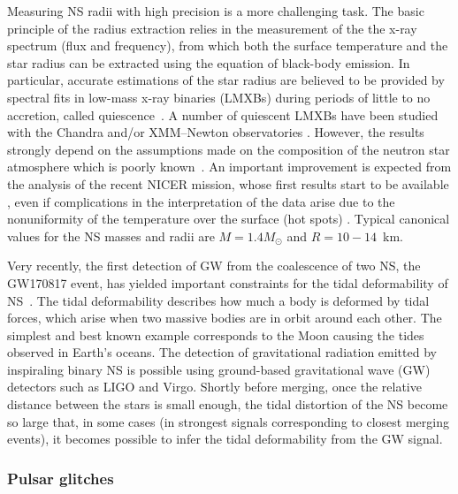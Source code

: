 Measuring NS radii with high precision is a more challenging task.
The basic principle of the radius extraction relies in the measurement of the 
the x-ray spectrum (flux and frequency), from which both the surface 
temperature and the star radius can be extracted using the equation of 
black-body emission.
In particular, accurate estimations of the star radius are believed to be 
provided by spectral fits in low-mass x-ray binaries (LMXBs) during periods of 
little to no accretion, called quiescence~\cite{Brown1998}.
%
A number of quiescent LMXBs have been studied with the Chandra and/or 
XMM–Newton 
observatories \cite{Heinke2014,Servillat2012,Guillot2014,Guillot2013}.
%
However, the results strongly depend on the assumptions made on the composition
of the neutron star atmosphere which is poorly known~\cite{Steiner2018}. 
An important improvement is expected from the analysis of the recent NICER 
mission, whose first results start to be available 
\cite{Bogdanov2019a,Bogdanov2019b,Miller2019,Raaijmakers2019,Riley2019}, 
even if complications in the interpretation of the 
data arise due to the nonuniformity of the temperature over the surface (hot
spots) \cite{Bogdanov2019a,Bogdanov2019b,Miller2019,Raaijmakers2019,Riley2019}. 
Typical canonical values for the NS masses and radii are $M = 1.4M_\odot$ and
$R=10-14$~km.
 
Very recently, the first detection of GW from the coalescence of two NS, 
the GW170817 event, has yielded important constraints for the tidal 
deformability of NS~\cite{GW1}.
The tidal deformability describes how much a body is deformed by tidal forces,
which arise when two massive bodies are in orbit around each other. 
The simplest and best known example corresponds to the Moon causing the tides 
observed in Earth's oceans.
The detection of gravitational radiation emitted by inspiraling binary NS 
is possible using ground-based gravitational wave (GW) detectors such as LIGO 
and Virgo. 
Shortly before merging, once the relative distance between the stars is small
enough, the tidal distortion of the NS become so large that, in some cases (in
strongest signals corresponding to closest merging events), it becomes possible 
to infer the tidal deformability from the GW signal. 

\subsubsection*{Pulsar glitches}

